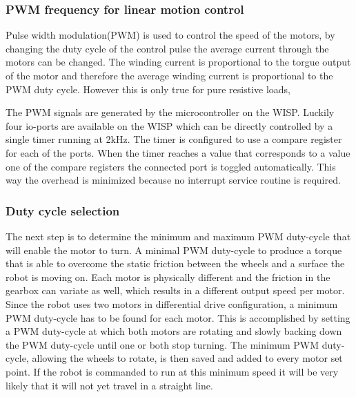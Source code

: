 \subsubsection{PWM frequency for linear motion control}

Pulse width modulation(PWM) is used to control the speed of the motors, by changing the duty cycle of the control pulse the average current through the motors can be changed.
The winding current is proportional to the torgue output of the motor and therefore the average winding current is proportional to the PWM duty cycle.
However this is only true for pure resistive loads,


The PWM signals are generated by the microcontroller on the WISP.
Luckily four io-ports are available on the WISP which can be directly controlled by a single timer running at 2kHz.
The timer is configured to use a compare register for each of the ports.
When the timer reaches a value that corresponds to a value one of the compare registers the connected port is toggled automatically.
This way the overhead is minimized because no interrupt service routine is required.

\subsubsection{Duty cycle selection}

The next step is to determine the minimum and maximum PWM duty-cycle that will enable the motor to turn.
A minimal PWM duty-cycle to produce a torque that is able to overcome the static friction between the wheels and a surface the robot is moving on.
Each motor is physically different and the friction in the gearbox can variate as well, which results in a different output speed per motor.
Since the robot uses two motors in differential drive configuration, a minimum PWM duty-cycle has to be found for each motor.
This is accomplished by setting a PWM duty-cycle at which both motors are rotating and slowly backing down the PWM duty-cycle until one or both stop turning.
The minimum PWM duty-cycle, allowing the wheels to rotate, is then saved and added to every motor set point.
If the robot is commanded to run at this minimum speed it will be very likely that it will not yet travel in a straight line.

